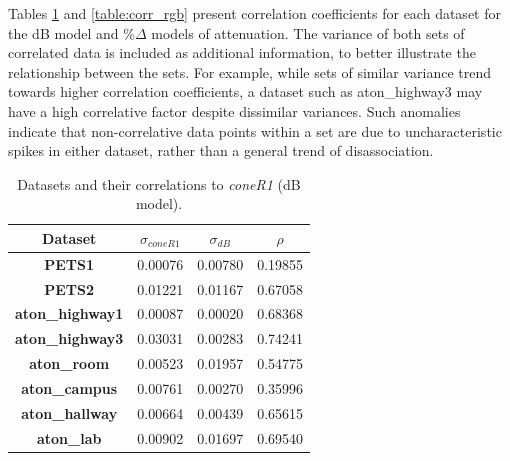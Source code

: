 \documentclass[12pt]{report}
\begin{document}
Tables \ref{table:corr_db} and \ref{table:corr_rgb} present correlation coefficients for each dataset for the dB model and \%$\Delta$ models of attenuation. The variance of both sets of correlated data is included as additional information, to better illustrate the relationship between the sets. For example, while sets of similar variance trend towards higher correlation coefficients, a dataset such as aton\_highway3 may have a high correlative factor despite dissimilar variances. Such anomalies indicate that non-correlative data points within a set are due to uncharacteristic spikes in either dataset, rather than a general trend of disassociation.

\begin{table}
\centering
\begin{tabular}{ |c|c|c|c| }
	\hline
	\textbf{Dataset} & \textbf{$\sigma_{coneR1}$} & \textbf{$\sigma_{dB}$} & \textbf{$\rho$} \\
	\hline
	\hline
	\textbf{PETS1} & 0.00076 & 0.00780 & 0.19855 \\
	\hline
	\textbf{PETS2} & 0.01221 & 0.01167 & 0.67058 \\
	\hline
	\textbf{aton\_highway1} & 0.00087 & 0.00020 & 0.68368 \\
	\hline
	\textbf{aton\_highway3} & 0.03031 & 0.00283 & 0.74241 \\
	\hline
	\textbf{aton\_room} & 0.00523 & 0.01957 &  0.54775 \\
	\hline
	\textbf{aton\_campus} & 0.00761 & 0.00270 &  0.35996 \\
	\hline
	\textbf{aton\_hallway} & 0.00664 & 0.00439 &  0.65615 \\
	\hline
	\textbf{aton\_lab} & 0.00902 & 0.01697 &  0.69540 \\
	\hline
\end{tabular}
\caption{Datasets and their correlations to \textit{coneR1} (dB model).}
\label{table:corr_db}
\end{table}
\end{document}
